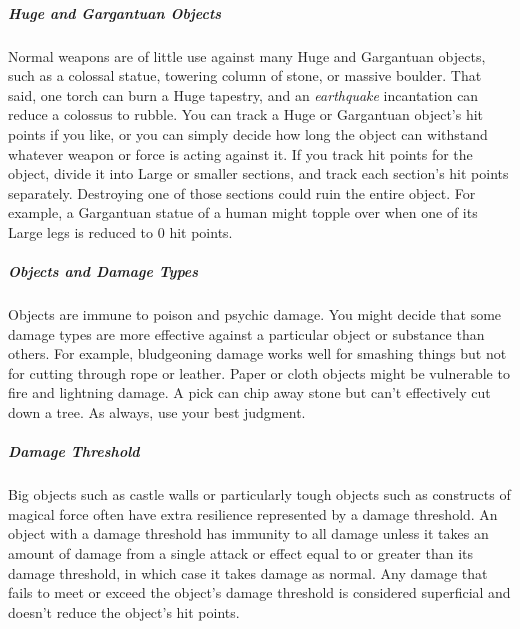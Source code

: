 \subparagraph*{Huge and Gargantuan Objects} Normal weapons are of little use against many Huge and Gargantuan objects, such as a colossal statue, towering column of stone, or massive boulder. That said, one torch can burn a Huge tapestry, and an \textit{earthquake} incantation can reduce a colossus to rubble. You can track a Huge or Gargantuan object's hit points if you like, or you can simply decide how long the object can withstand whatever weapon or force is acting against it. If you track hit points for the object, divide it into Large or smaller sections, and track each section's hit points separately. Destroying one of those sections could ruin the entire object. For example, a Gargantuan statue of a human might topple over when one of its Large legs is reduced to 0 hit points.

\subparagraph*{Objects and Damage Types} Objects are immune to poison and psychic damage. You might decide that some damage types are more effective against a particular object or substance than others. For example, bludgeoning damage works well for smashing things but not for cutting through rope or leather. Paper or cloth objects might be vulnerable to fire and lightning damage. A pick can chip away stone but can't effectively cut down a tree. As always, use your best judgment.

\subparagraph*{Damage Threshold} Big objects such as castle walls or particularly tough objects such as constructs of magical force often have extra resilience represented by a damage threshold. An object with a damage threshold has immunity to all damage unless it takes an amount of damage from a single attack or effect equal to or greater than its damage threshold, in which case it takes damage as normal. Any damage that fails to meet or exceed the object's damage threshold is considered superficial and doesn't reduce the object's hit points.
